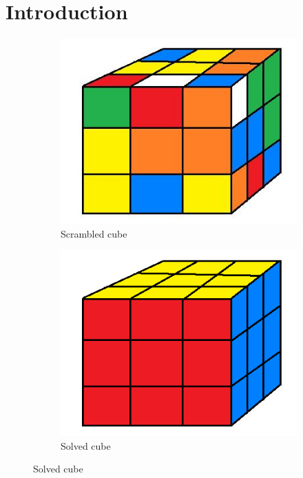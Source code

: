 \documentclass[a4paper,11pt]{kth-mag}
\begin{document}
\chapter{Introduction}
\begin{figure}
	\centering
	\begin{subfigure}[b]{0.3\textwidth}
		\includegraphics[width=\textwidth]{figs/scramble.jpg}
		\caption{Scrambled cube}
	\end{subfigure}
	\begin{subfigure}[b]{0.3\textwidth}
		\includegraphics[width=\textwidth]{figs/DONE.png}
		\caption{Solved cube}
	\end{subfigure}
\end{figure}
\end{document}
